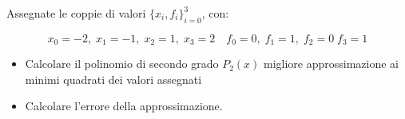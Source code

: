Assegnate le coppie di valori $\{x_i,f_i \}_{i=0}^3$, con:

\[ x_0=-2, \; x_1=-1, \; x_2=1, \; x_3=2 \quad f_0=0, \; f_1=1, \; f_2=0 \; f_3=1 \]

\begin{itemize}
\item Calcolare il polinomio di secondo grado $P_2(x)$
migliore approssimazione ai minimi quadrati dei valori assegnati
\item Calcolare l'errore della approssimazione.
\end{itemize}
